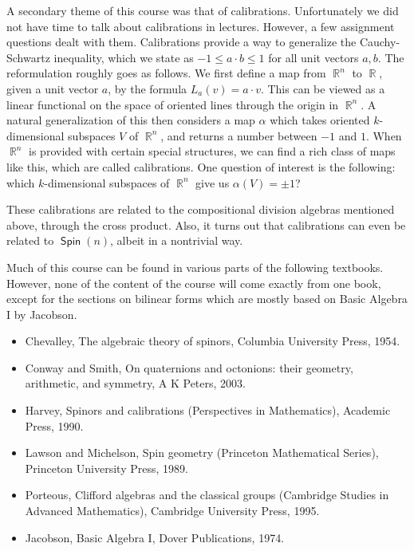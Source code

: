 \documentclass[10pt]{article}
\numberwithin{equation}{section}
\DeclareMathOperator{\RR}{\mathbb{R}}
\DeclareMathOperator{\Spin}{\textsf{Spin}}
\theoremstyle{definition}
\numberwithin{thm}{section}
\numberwithin{example}{section}
\numberwithin{defn}{section}
\numberwithin{lemma}{section}
\numberwithin{cor}{section}
\begin{document}
A secondary theme of this course was that of calibrations. Unfortunately we did not have time to talk about calibrations in lectures. However, a few assignment questions dealt with them. Calibrations provide a way to generalize the Cauchy-Schwartz inequality, which we state as $-1\leq a\cdot b\leq 1$ for all unit vectors $a,b$. The reformulation roughly goes as follows. We first define a map from $\RR^n$ to $\RR$, given a unit vector $a$, by the formula $L_a(v) = a\cdot v$. This can be viewed as a linear functional on the space of oriented lines through the origin in $\RR^n$. A natural generalization of this then considers a map $\alpha$ which takes oriented $k$-dimensional subspaces $V$ of $\RR^n$, and returns a number between $-1$ and $1$. When $\RR^n$ is provided with certain special structures, we can find a rich class of maps like this, which are called calibrations. One question of interest is the following: which $k$-dimensional subspaces of $\RR^n$ give us $\alpha(V) = \pm 1$? 

These calibrations are related to the compositional division algebras mentioned above, through the cross product. Also, it turns out that calibrations can even be related to $\Spin(n)$, albeit in a nontrivial way.

Much of this course can be found in various parts of the following textbooks. However, none of the content of the course will come exactly from one book, except for the sections on bilinear forms which are mostly based on Basic Algebra I by Jacobson.
\begin{itemize}
\item \cite{Chevalley1995-fk} Chevalley, The algebraic theory of spinors, Columbia University Press, 1954. 
\item \cite{Conway2001-rn} Conway and Smith, On quaternions and octonions: their geometry, arithmetic, and symmetry, A K Peters,
2003.
\item \cite{Reese_Harvey1990-fv} Harvey, Spinors and calibrations (Perspectives in Mathematics), Academic Press, 1990.
\item \cite{Lawson1990-fd} Lawson and Michelson, Spin geometry (Princeton Mathematical Series), Princeton University Press, 1989.
\item \cite{Porteous1995-hp} Porteous, Clifford algebras and the classical groups (Cambridge Studies in Advanced Mathematics), Cambridge University Press, 1995.
\item \cite{Jacobson2009-pp} Jacobson, Basic Algebra I, Dover Publications, 1974.
\end{itemize}










\pagebreak

\printbibliography

\pagebreak

\printindex
\end{document}
